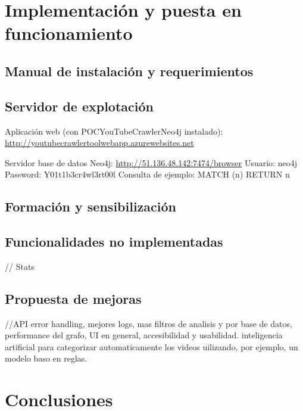 \documentclass[11pt,a4paper]{article}
\begin{document}
\newpage 


\section{Implementación y puesta en funcionamiento}
\bigskip 

\subsection{Manual de instalación y requerimientos}
\medskip 

\subsection{Servidor de explotación}
Aplicación web (con POCYouTubeCrawlerNeo4j instalado):
\url{http://youtubecrawlertoolwebapp.azurewebsites.net} 

Servidor base de datos Neo4j:
\url{http://51.136.48.142:7474/browser} 
Usuario: neo4j
Password: Y01t1b3cr4wl3rt00l
Consulta de ejemplo: MATCH (n) RETURN n
\medskip 

\subsection{Formación y sensibilización}
\medskip 

\subsection{Funcionalidades no implementadas}
// Stats
\medskip 

\subsection{Propuesta de mejoras}
//API error handling, mejores logs, mas filtros de analisis y por base de datos, performance del grafo, UI en general, accesibilidad y usabilidad. inteligencia artificial para categorizar automaticamente los videos uilizando, por ejemplo, un modelo baso en reglas.
\newpage 




\section{Conclusiones}
\bigskip 
\end{document}
